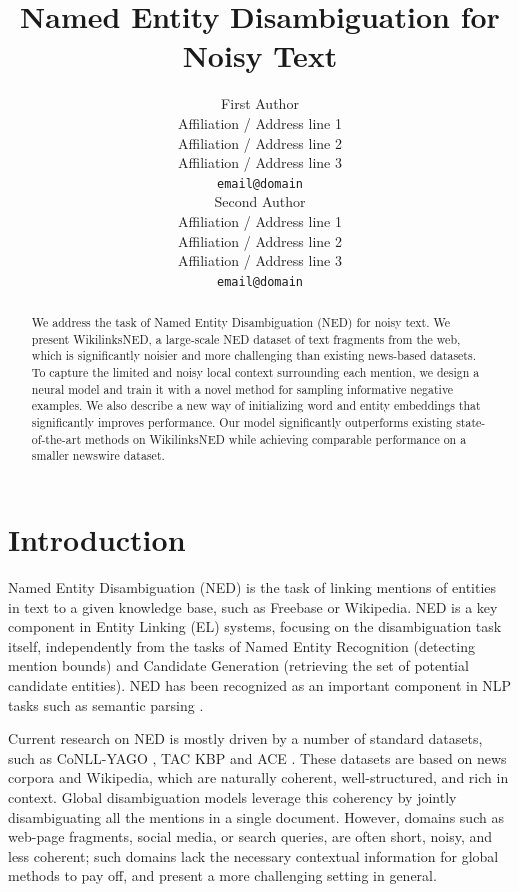 \documentclass[11pt,letterpaper]{article}
\title{Named Entity Disambiguation for Noisy Text}
\author{First Author \\
	Affiliation / Address line 1 \\
	Affiliation / Address line 2 \\
	Affiliation / Address line 3 \\
	{\tt email@domain} \\\And
	Second Author \\
	Affiliation / Address line 1 \\ 
	Affiliation / Address line 2 \\
	Affiliation / Address line 3 \\
	{\tt email@domain} \\}
\date{}
\begin{document}
	\maketitle
	\begin{abstract}
		We address the task of Named Entity Disambiguation (NED) for noisy text. 
		We present WikilinksNED, a large-scale NED dataset of text fragments from the web, which is significantly noisier and more challenging than existing news-based datasets.
		To capture the limited and noisy local context surrounding each mention, we design a neural model and train it with a novel method for sampling informative negative examples. We also describe a new way of initializing word and entity embeddings that significantly improves performance.
		Our model significantly outperforms existing state-of-the-art methods on WikilinksNED while achieving comparable performance on a smaller newswire dataset.
	\end{abstract}
	
	
	
	\section{Introduction}
			
	Named Entity Disambiguation (NED) is the task of linking mentions of entities in text to a given knowledge base, such as Freebase or Wikipedia. 
	NED is a key component in Entity Linking (EL) systems, focusing on the disambiguation task itself, independently from the tasks of Named Entity Recognition (detecting mention bounds) and Candidate Generation (retrieving the set of potential candidate entities). NED has been recognized as an important component in NLP tasks such as semantic parsing \cite{berant2013semantic}.
		
	Current research on NED is mostly driven by a number of standard datasets, such as CoNLL-YAGO \cite{hoffart2011robust}, TAC KBP \cite{ji2010overview} and ACE \cite{bentivogli2010extending}. These datasets are based on news corpora and Wikipedia, which are naturally coherent, well-structured, and rich in context. Global disambiguation models \cite{guo2014entity,pershina2015personalized,Globerson2016} leverage this coherency by jointly disambiguating all the mentions in a single document. However, domains such as web-page fragments, social media, or search queries, are often short, noisy, and less coherent; such domains lack the necessary contextual information for global methods to pay off, and present a more challenging setting in general.
\end{document}
